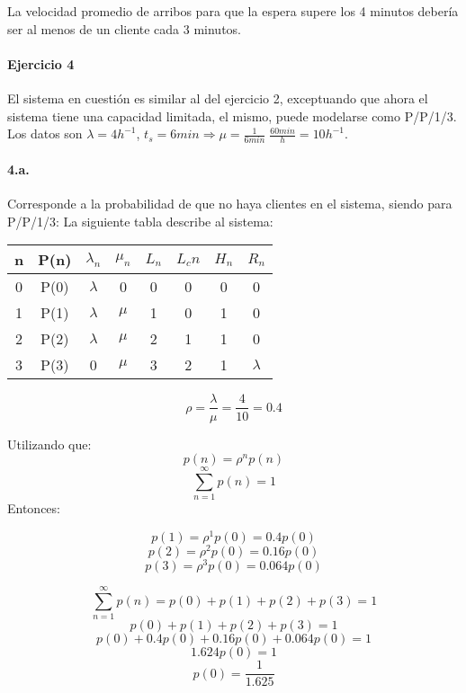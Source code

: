 \documentclass{article}
\begin{document}
    La velocidad promedio de arribos para que la espera supere los 4 minutos debería ser al menos de un cliente cada 3 minutos.


\paragraph{Ejercicio 4}
    El sistema en cuestión es similar al del ejercicio 2, exceptuando que ahora el sistema tiene una capacidad limitada, 
el mismo, puede modelarse como P/P/1/3. Los datos son $ \lambda = 4h^{-1} $, $ t_s = 6min \Rightarrow \mu = \frac{1}{6min} \; \frac{60min}{h} = 10h^{-1} $.
    
    \paragraph{4.a.} Corresponde a la probabilidad de que no haya clientes en el sistema, siendo para P/P/1/3:
     La siguiente tabla describe al sistema:
    \begin{center}
    \begin{tabular}{|| c | c | c | c | c | c | c | c ||}
    \hline 
     n & P(n) & $\lambda_n$ & $\mu_n$ & $L_n$& $L_cn$ & $H_n$ & $R_n$ \\ \hline \hline
     0 & P(0) & $\lambda$   & 0       & 0    & 0      & 0     & 0	\\ \hline
     1 & P(1) & $\lambda$   & $\mu$   & 1    & 0      & 1     & 0	\\ \hline
     2 & P(2) & $\lambda$   & $\mu$  & 2    & 1      & 1     & 0	\\ \hline
     3 & P(3) & 0 & $\mu$  & 3    & 2      & 1     & $\lambda$ \\ \hline
     
    \end{tabular}
    \end{center}
    
    $$\rho = \frac{\lambda}{\mu} = \frac{4}{10}=0.4 $$

  Utilizando que: 
    $$ p(n) = \rho^{n} p(n)$$
    $$ \sum _{n=1}^{\infty} {p(n)} = 1$$
  Entonces:

    $$ p(1) = \rho^{1} p(0) = 0.4 p(0)$$
    $$ p(2) = \rho^{2} p(0) = 0.16 p(0)$$
    $$ p(3) = \rho^{3} p(0) = 0.064 p(0)$$
    
    $$ \sum _{n=1}^{\infty} {p(n)} = p(0) + p(1) + p(2) + p(3) = 1$$
    $$p(0) + p(1) + p(2) + p(3) = 1$$
    $$p(0) + 0.4 p(0) + 0.16 p(0) + 0.064 p(0) = 1$$
    $$1.624 p(0) = 1$$
    $$p(0) = \frac{1}{1.625}$$
\end{document}
